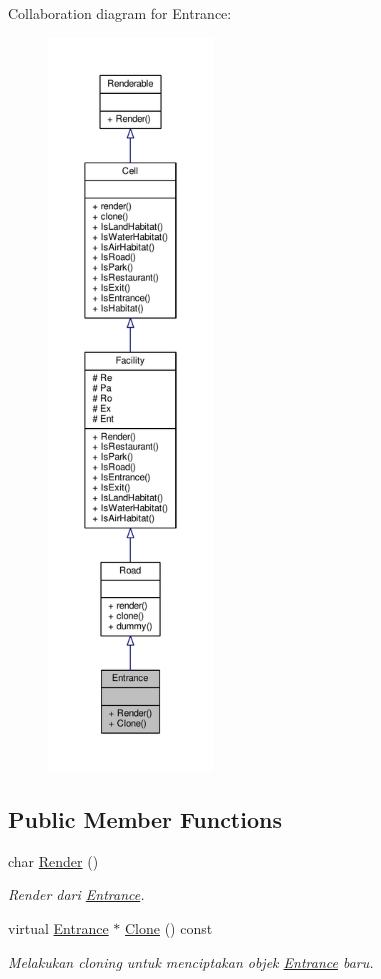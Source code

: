 Collaboration diagram for Entrance\+:
\nopagebreak
\begin{figure}[H]
\begin{center}
\leavevmode
\includegraphics[height=550pt]{classEntrance__coll__graph}
\end{center}
\end{figure}
\subsection*{Public Member Functions}
\begin{DoxyCompactItemize}
\item 
char \hyperlink{classEntrance_a7226e0cd3d04f8370ede2573bc2852f3}{Render} ()
\begin{DoxyCompactList}\small\item\em Render dari \hyperlink{classEntrance}{Entrance}. \end{DoxyCompactList}\item 
virtual \hyperlink{classEntrance}{Entrance} $\ast$ \hyperlink{classEntrance_a360c7c24284c6004fcdacb09afa0d8ac}{Clone} () const 
\begin{DoxyCompactList}\small\item\em Melakukan cloning untuk menciptakan objek \hyperlink{classEntrance}{Entrance} baru. \end{DoxyCompactList}\end{DoxyCompactItemize}
